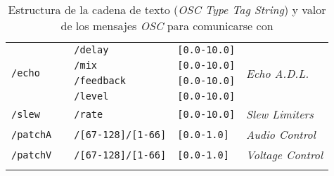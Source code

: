 \begin{longtable}{ l c l l l }
    \multirow{4}{*}{\texttt{/echo}}	& 	& \texttt{/delay}	&\texttt{[0.0-10.0]} & \multirow{4}{*}{\textit{Echo A.D.L.}}\\
    & & \texttt{/mix} & \texttt{[0.0-10.0]} & \\
    & & \texttt{/feedback} & \texttt{[0.0-10.0]} & \\
    & & \texttt{/level} & \texttt{[0.0-10.0]} & \\
    \hline
    
    \multirow{1}{*}{\texttt{/slew}}	& 	& \texttt{/rate}	&\texttt{[0.0-10.0]} & \multirow{1}{*}{\textit{Slew Limiters}}\\
    \hline
    
    \multirow{1}{*}{\texttt{/patchA}}	& 	
    & \texttt{/[67-128]/[1-66]} 	&\texttt{[0.0-1.0]} & \multirow{1}{*}{\textit{Audio Control}}\\
    \hline
    
    \multirow{1}{*}{\texttt{/patchV}}	& 	
    & \texttt{/[67-128]/[1-66]} 	&\texttt{[0.0-1.0]} & \multirow{1}{*}{\textit{Voltage Control}}\\
    \hline
    

\caption[Estructura de los mensajes \textit{OSC}]{Estructura de la cadena de texto (\textit{OSC Type Tag String}) y valor de los mensajes \textit{OSC} para comunicarse con }
\label{table:osc}
\end{longtable}